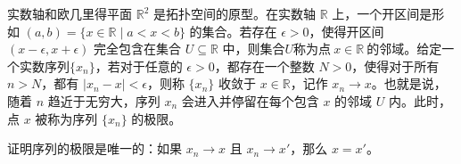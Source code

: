 实数轴和欧几里得平面 $\mathbb{R}^{2}$ 是拓扑空间的原型。在实数轴 $\mathbb{R}$ 上，一个开区间是形如 $(a,b)=\{x\in \mathbb{R} \mid a< x< b\}$ 的集合。若存在 $\epsilon  >0$，使得开区间 $(x-\epsilon ,x+\epsilon )$ 完全包含在集合 $U\subseteq \mathbb{R}$ 中，则集合$U$称为点$\ x\in \mathbb{R} \ $的邻域。给定一个实数序列$\{x_{n} \}$，若对于任意的 $\epsilon  >0$，都存在一个整数 $N >0$，使得对于所有 $n >N$，都有 $|x_{n} -x|< \epsilon $，则称 $\{x_{n} \}$ 收敛于 $x\in \mathbb{R}$，记作 $x_{n}\rightarrow x$。也就是说，随着 $\displaystyle n$ 趋近于无穷大，序列 $x_{n}$ 会进入并停留在每个包含 $x$ 的邻域 $U$ 内。此时，点 $x$ 被称为序列 $\{x_{n} \}$ 的极限。

\begin{exercise}
    证明序列的极限是唯一的：如果 $x_{n}\rightarrow x$ 且 $x_{n}\rightarrow x'$，那么 $x=x'$。
\end{exercise}

